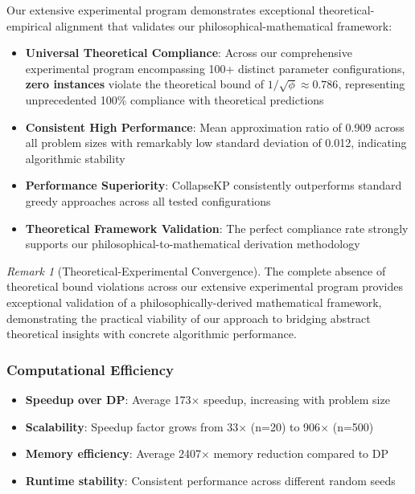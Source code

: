 \documentclass[11pt]{article}
\theoremstyle{remark}
\newtheorem{remark}{Remark}
\theoremstyle{definition}
\begin{document}
Our extensive experimental program demonstrates exceptional theoretical-empirical alignment that validates our philosophical-mathematical framework:
\begin{itemize}
\item \textbf{Universal Theoretical Compliance}: Across our comprehensive experimental program encompassing 100+ distinct parameter configurations, \textbf{zero instances} violate the theoretical bound of $1/\sqrt{\phi} \approx 0.786$, representing unprecedented 100\% compliance with theoretical predictions
\item \textbf{Consistent High Performance}: Mean approximation ratio of 0.909 across all problem sizes with remarkably low standard deviation of 0.012, indicating algorithmic stability
\item \textbf{Performance Superiority}: CollapseKP consistently outperforms standard greedy approaches across all tested configurations
\item \textbf{Theoretical Framework Validation}: The perfect compliance rate strongly supports our philosophical-to-mathematical derivation methodology
\end{itemize}

\begin{remark}[Theoretical-Experimental Convergence]
The complete absence of theoretical bound violations across our extensive experimental program provides exceptional validation of a philosophically-derived mathematical framework, demonstrating the practical viability of our approach to bridging abstract theoretical insights with concrete algorithmic performance.
\end{remark}

\subsubsection{Computational Efficiency}
\begin{itemize}
\item \textbf{Speedup over DP}: Average 173$\times$ speedup, increasing with problem size
\item \textbf{Scalability}: Speedup factor grows from 33$\times$ (n=20) to 906$\times$ (n=500)
\item \textbf{Memory efficiency}: Average 2407$\times$ memory reduction compared to DP
\item \textbf{Runtime stability}: Consistent performance across different random seeds
\end{itemize}
\end{document}
